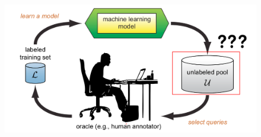 \documentclass[10pt]{beamer}
\begin{document}
\begin{frame}[fragile]
    \begin{figure}[htp]
        \centering
        \includegraphics[scale=0.3]{images/active_learning_uncertainty.png}
    \end{figure}
\end{frame}
%
%
%
%
%
%
%
%
%
%
%
%
%
%
%
\end{document}
